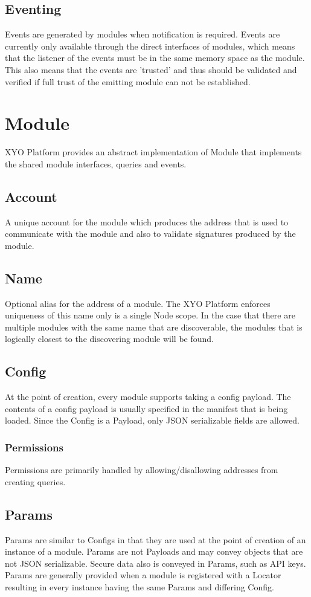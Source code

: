 \documentclass{article}
\begin{document}
\subsection{Eventing}
Events are generated by modules when notification is required.  Events are currently only available through the direct interfaces of modules, which means that the listener of the events must be in the same memory space as the module.  This also means that the events are 'trusted' and thus should be validated and verified if full trust of the emitting module can not be established.

\section{Module}
XYO Platform provides an abstract implementation of Module that implements the shared module interfaces, queries and events.
\subsection{Account}
A unique account for the module which produces the address that is used to communicate with the module and also to validate signatures produced by the module.
\subsection{Name}
Optional alias for the address of a module.  The XYO Platform enforces uniqueness of this name only is a single Node scope.  In the case that there are multiple modules with the same name that are discoverable, the modules that is logically closest to the discovering module will be found.

\subsection{Config}
At the point of creation, every module supports taking a config payload.  The contents of a config payload is usually specified in the manifest that is being loaded.  Since the Config is a Payload, only JSON serializable fields are allowed.
\subsubsection{Permissions}
Permissions are primarily handled by allowing/disallowing addresses from creating queries.
\subsection{Params}
Params are similar to Configs in that they are used at the point of creation of an instance of a module.  Params are not Payloads and may convey objects that are not JSON serializable.  Secure data also is conveyed in Params, such as API keys.  Params are generally provided when a module is registered with a Locator resulting in every instance having the same Params and differing Config.
\end{document}
